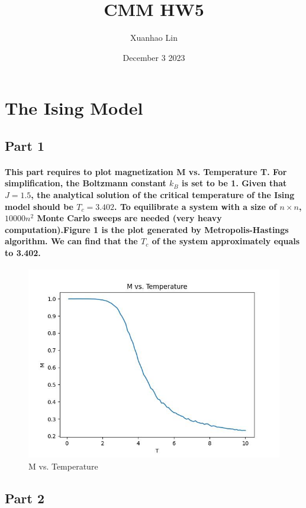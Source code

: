\documentclass{article}
\title{CMM HW5}
\author{Xuanhao Lin}
\date{December 3 2023}
\begin{document}
\maketitle

\section{The Ising Model}
\subsection{Part 1}
\paragraph{
This part requires to plot magnetization M vs. Temperature T. For simplification, the Boltzmann constant $k_B$ is set to be 1. Given that \(J=1.5\), the analytical solution of the critical temperature of the Ising model should be \(T_c=3.402\). To equilibrate a system with a size of $n\times$$n$, \(10000n^2\) Monte Carlo sweeps are needed (very heavy computation).Figure 1 is the plot generated by Metropolis-Hastings algorithm. We can find that the $T_c$ of the system approximately equals to 3.402.
}
\begin{figure}[htbp]
    \centering
    \includegraphics[width=0.5\linewidth]{Part1.jpeg}
    \caption{M vs. Temperature}
\end{figure}
\subsection{Part 2}
\end{document}

